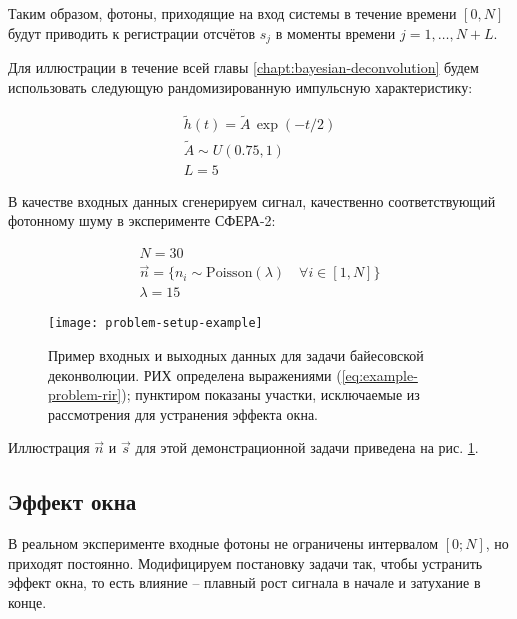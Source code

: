 Таким образом, фотоны, приходящие на вход системы в течение времени $\left[0, N\right]$ будут приводить к регистрации отсчётов $s_j$ в моменты времени $j = 1, \ldots, N + L$.

Для иллюстрации в течение всей главы \ref{chapt:bayesian-deconvolution} будем использовать следующую рандомизированную импульсную характеристику: 

\begin{equation}
	\label{eq:example-problem-rir}
	\begin{gathered}
		\tilde{h}(t) = \tilde{A} \, \exp(-t/2) \\
		\tilde{A} \sim U(0.75, 1) \\
		L = 5
	\end{gathered}
\end{equation}

В качестве входных данных сгенерируем сигнал, качественно соответствующий фотонному шуму в эксперименте СФЕРА-2: 

\begin{equation}
	\label{eq:example-problem-input}
	\begin{gathered}
		N = 30 \\
		\vec{n} = \{n_i \sim \mathrm{Poisson}(\lambda) \quad \forall i \in [1, N]\} \\
		\lambda = 15
	\end{gathered}
\end{equation} 

\begin{figure}
	\centering
	\texttt{[image: problem-setup-example]}
	\caption{Пример входных и выходных данных для задачи байесовской деконволюции. РИХ определена выражениями (\ref{eq:example-problem-rir}); пунктиром показаны участки, исключаемые из рассмотрения для устранения эффекта окна.}
	\label{pic:problem-setup}
\end{figure}

Иллюстрация $\vec{n}$ и $\vec{s}$ для этой демонстрационной задачи приведена на рис. \ref{pic:problem-setup}.

\subsection{Эффект окна} \label{sec:edge-effects}

В реальном эксперименте входные фотоны не ограничены интервалом $[0; N]$, но приходят постоянно. Модифицируем постановку задачи так, чтобы устранить эффект окна, то есть влияние  -- плавный рост сигнала в начале и затухание в конце.

